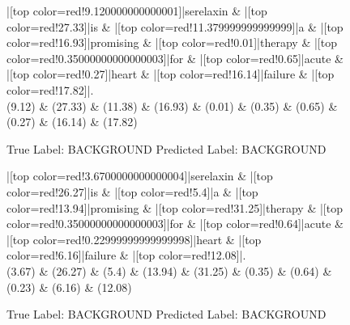 \documentclass[a4paper, landscape]{article}
\begin{document}
\clearpage
\begin{figure}
\begin{center}
\begin{dependency}
\begin{deptext}
|[top color=red!9.120000000000001]|serelaxin \& |[top color=red!27.33]|is \& |[top color=red!11.379999999999999]|a \& |[top color=red!16.93]|promising \& |[top color=red!0.01]|therapy \& |[top color=red!0.35000000000000003]|for \& |[top color=red!0.65]|acute \& |[top color=red!0.27]|heart \& |[top color=red!16.14]|failure \& |[top color=red!17.82]|.\\
(9.12) \& (27.33) \& (11.38) \& (16.93) \& (0.01) \& (0.35) \& (0.65) \& (0.27) \& (16.14) \& (17.82)\\
\end{deptext}
\end{dependency}
\end{center}
\caption{True Label: BACKGROUND Predicted Label: BACKGROUND}
\end{figure}
\clearpage
\begin{figure}
\begin{center}
\begin{dependency}
\begin{deptext}
|[top color=red!3.6700000000000004]|serelaxin \& |[top color=red!26.27]|is \& |[top color=red!5.4]|a \& |[top color=red!13.94]|promising \& |[top color=red!31.25]|therapy \& |[top color=red!0.35000000000000003]|for \& |[top color=red!0.64]|acute \& |[top color=red!0.22999999999999998]|heart \& |[top color=red!6.16]|failure \& |[top color=red!12.08]|.\\
(3.67) \& (26.27) \& (5.4) \& (13.94) \& (31.25) \& (0.35) \& (0.64) \& (0.23) \& (6.16) \& (12.08)\\
\end{deptext}
\end{dependency}
\end{center}
\caption{True Label: BACKGROUND Predicted Label: BACKGROUND}
\end{figure}
\end{document}
